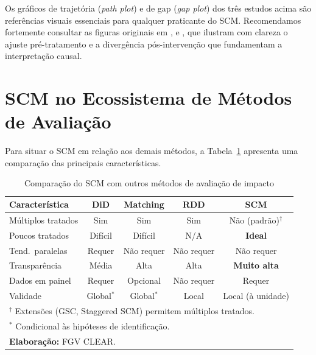 \documentclass[12pt, a4paper, openany]{book}
\begin{document}
\begin{notabox}
Os gráficos de trajetória (\textit{path plot}) e de gap (\textit{gap plot}) dos três estudos acima são referências visuais essenciais para qualquer praticante do SCM. Recomendamos fortemente consultar as figuras originais em \cite{AbadieGardeazabal2003}, \cite{AbadieDiamondHainmueller2010} e \cite{AbadieDiamondHainmueller2015}, que ilustram com clareza o ajuste pré-tratamento e a divergência pós-intervenção que fundamentam a interpretação causal.
\end{notabox}


\section{SCM no Ecossistema de Métodos de Avaliação}

Para situar o SCM em relação aos demais métodos, a Tabela~\ref{tab:ecossistema} apresenta uma comparação das principais características.

\begin{table}[H]
\centering
\caption{Comparação do SCM com outros métodos de avaliação de impacto}
\label{tab:ecossistema}
\small
\begin{tabular}{lcccc}
\toprule
\textbf{Característica} & \textbf{DiD} & \textbf{Matching} & \textbf{RDD} & \textbf{SCM} \\
\midrule
Múltiplos tratados     & Sim           & Sim             & Sim          & Não (padrão)$^\dagger$ \\
Poucos tratados        & Difícil       & Difícil         & N/A          & \textbf{Ideal} \\
Tend.\ paralelas       & Requer        & Não requer      & Não requer   & Não requer \\
Transparência          & Média         & Alta            & Alta         & \textbf{Muito alta} \\
Dados em painel        & Requer        & Opcional        & Não requer   & Requer \\
Validade               & Global$^*$    & Global$^*$      & Local        & Local (à unidade) \\
\bottomrule
\multicolumn{5}{l}{\footnotesize $^\dagger$ Extensões (GSC, Staggered SCM) permitem múltiplos tratados.} \\
\multicolumn{5}{l}{\footnotesize $^*$ Condicional às hipóteses de identificação.} \\
\multicolumn{5}{l}{\footnotesize \textbf{Elaboração:} FGV CLEAR.}
\end{tabular}
\end{table}
\end{document}
